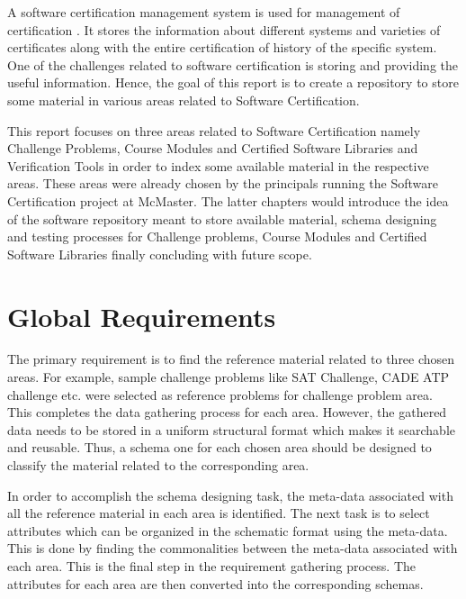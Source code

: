 \documentclass[11pt,letterpaper]{report}
\begin{document}
A software certification management system is used for management of certification \cite{SCMS}. It stores the information about different systems and varieties of certificates along with the entire certification of history of the specific system. One of the challenges related to software certification is storing and providing the useful information. Hence, the goal of this report is to create a repository to store some material in various areas related to Software Certification.

This report focuses on three areas related to Software Certification namely Challenge Problems, Course Modules and Certified Software Libraries and Verification Tools in order to index some available material in the respective areas. These areas were already chosen by the principals running the Software Certification project at McMaster. The latter chapters would introduce the idea of the software repository meant to store available material, schema designing and testing processes for Challenge problems, Course Modules and Certified Software Libraries finally concluding with future scope.

\chapter{Global Requirements}
The primary requirement is to find the reference material related to three chosen areas. For example, sample challenge problems like SAT Challenge, CADE ATP challenge etc. were selected as reference problems for challenge problem area. 
This completes the data gathering process for each area. However, the gathered data needs to be stored in a uniform structural format which makes it searchable and reusable. Thus, a schema one for each chosen area should be designed to classify the material related to the corresponding area. 

In order to accomplish the schema designing task, the meta-data associated with all the reference material in each area is identified. The next task is to select attributes which can be organized in the schematic format using the meta-data. This is done by finding the commonalities between the meta-data associated with each area. This is the final step in the requirement gathering process. The attributes for each area are then converted into the corresponding schemas.   
\end{document}
